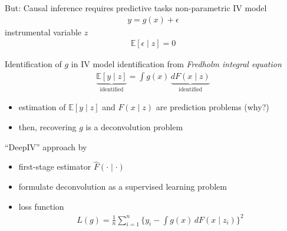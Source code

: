 \documentclass[xcolor=dvipsnames]{beamer}
\newcommand{\E}{\mathbb{E}}
\begin{document}
\begin{frame}{But: Causal inference requires predictive tasks}
non-parametric IV model \parencite{newey2003instrumental}
\begin{align*}
  y = g(x) + \epsilon
\end{align*}
instrumental variable $z$ 
\begin{align*}
  \E[\epsilon \mid z] = 0
\end{align*}
\end{frame}


\begin{frame}{Identification of $g$ in IV model}
identification from \emph{Fredholm integral equation}
\begin{align*}
  \underbrace{\E[y \mid z]}_{\text{identified}} = \int g(x) \, \underbrace{dF(x \mid z)}_{\text{identified}}
\end{align*}
\begin{itemize}
  \item estimation of $\E[y \mid z]$ and $F(x \mid z)$ are prediction problems (why?)
  \item then, recovering $g$ is a deconvolution problem
\end{itemize}
\end{frame}


\begin{frame}{``DeepIV'' approach by \textcite{hartford2017deep}}
\begin{itemize}
  \item first-stage estimator $\hat{F}(\cdot \mid \cdot)$
  \item formulate deconvolution as a supervised learning problem
  \item loss function
  \begin{align*}
    L(g) = \frac{1}{n} \sum_{i=1}^n \Big\{
      y_i - \int g(x) \, dF(x \mid z_i)
    \Big\}^2 
  \end{align*}
\end{itemize}
\end{frame}
\end{document}
